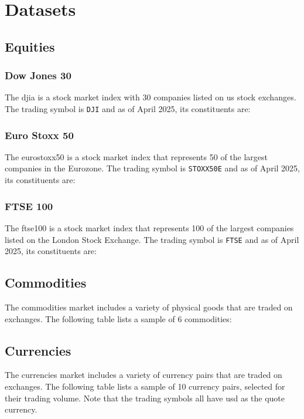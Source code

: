 \chapter{Datasets} \label{app:datasets}

\section{Equities} \label{sec:datasets-equities}
\subsection{Dow Jones 30} \label{sec:datasets-djia}

The \acrfull{djia} is a stock market index with 30 companies listed on \acrfull{us} stock exchanges. The trading symbol is \texttt{DJI} and as of April 2025, its constituents are: 



\subsection{Euro Stoxx 50} \label{sec:datasets-eurostoxx50}

The \acrfull{eurostoxx50} is a stock market index that represents 50 of the largest companies in the Eurozone. The trading symbol is \texttt{STOXX50E} and as of April 2025, its constituents are:



\subsection{FTSE 100} \label{sec:datasets-ftse100}

The \acrfull{ftse100} is a stock market index that represents 100 of the largest companies listed on the London Stock Exchange. The trading symbol is \texttt{FTSE} and as of April 2025, its constituents are:



\section{Commodities} \label{sec:datasets-commodities}

The commodities market includes a variety of physical goods that are traded on exchanges. The following table lists a sample of 6 commodities:



\section{Currencies} \label{sec:datasets-currencies}

The currencies market includes a variety of currency pairs that are traded on exchanges. The following table lists a sample of 10 currency pairs, selected for their trading volume. Note that the trading symbols all have \acrfull{usd} as the quote currency.


